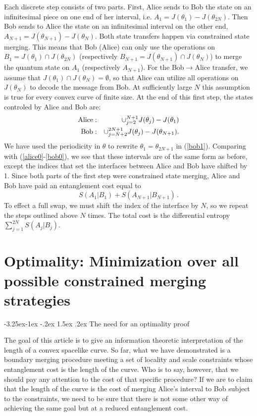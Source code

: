 \documentclass[12pt]{article}
\makeatletter
\renewcommand\subsection{\@startsection{subsection}{2}{\z@}%
                                     {-3.25ex\@plus -1ex \@minus -.2ex}%
                                     {1.5ex \@plus .2ex}%
                                     {\normalfont\bfseries}}
\makeatother
\begin{document}
Each discrete step consists of two parts. First, Alice sends to Bob the state on an infinitesimal piece on one end of her interval, i.e. $A_1=J(\theta_1)-J(\theta_{2N})$. Then Bob sends to Alice the state on an infinitesimal interval on the other end, $A_{N+1}=J(\theta_{N+1})-J(\theta_N)$. Both state transfers happen via constrained state merging. This means that Bob (Alice) can only use the operations on $B_1=J(\theta_1)\cap J(\theta_{2N})$ (respectively $B_{N+1} = J(\theta_{N+1}) \cap J(\theta_N)$) to merge the quantum state on $A_1$ (respectively $A_{N+1}$). For the Bob$\to$Alice transfer, we assume that $J(\theta_1) \cap J(\theta_N) = \emptyset$, so that Alice can utilize all operations on $J(\theta_N)$ to decode the message from Bob. At sufficiently large $N$ this assumption is true for every convex curve of finite size. At the end of this first step, the states controled by Alice and Bob are:
\begin{eqnarray}
{\rm Alice:} & & \cup_{j = 2}^{N+1} J(\theta_j) - J(\theta_{1}) \label{alice1} \\
{\rm Bob:} & & \cup_{j = N+2}^{2N+1} J(\theta_j) - J(\theta_{N+1})\label{bob1}.
\end{eqnarray}
We have used the periodicity in $\theta$ to rewrite $\theta_1 = \theta_{2N+1}$ in (\ref{bob1}).
Comparing with (\ref{alice0}-\ref{bob0}), we see that these intervals are of the same form as before, except the indices that set the interfaces between Alice and Bob have shifted by 1. Since both parts of the first step were constrained state merging, Alice and Bob have paid an entanglement cost equal to
\begin{equation}
S(A_1 | B_1) + S(A_{N+1} | B_{N+1})\,.
\end{equation}
To effect a full swap, we must shift the index of the interface by $N$, so we repeat the steps outlined above $N$ times. The total cost is the differential entropy $\sum_{j=1}^{2N} S(A_j | B_j)$.

\section{Optimality: Minimization over all possible constrained merging strategies} \label{optimality}

\subsection{The need for an optimality proof}

The goal of this article is to give an information theoretic interpretation of the length of a convex spacelike curve. So far, what we have demonstrated is a boundary merging procedure meeting a set of locality and scale constraints whose entanglement cost is the length of the curve. Who is to say, however, that we should pay any attention to the cost of that specific procedure? If we are to claim that the length of the curve is the cost of merging Alice's interval to Bob subject to the constraints, we need to be sure that there is not some other way of achieving the same goal but at a reduced entanglement cost.
\end{document}
